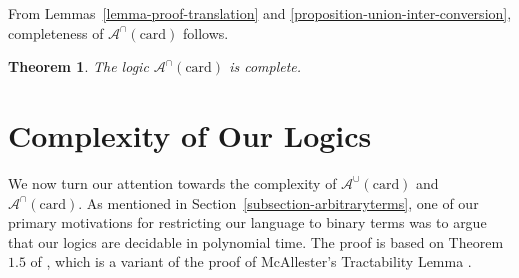 \documentclass[letterpaper]{article} %
\newtheorem{theorem}{Theorem}[section]
\theoremstyle{definition}
\newcommand{\Model}{\mathcal{M}}
\newcommand{\set}[1]{\{ #1 \}}
\newcommand{\proves}{\vdash}
\newcommand{\lang}{\mathcal{L}}
\newcommand{\rem}[1]{\relax}
\newcommand{\Aunion}{\mathscr{A}^{\cup}}
\newcommand{\Ainter}{\mathscr{A}^{\cap}}
\newcommand{\Sinter}{\mathscr{S}^{\cap}}
\newcommand{\SomeNoArgs}{\mathsf{Some}}
\newcommand{\card}{\mathrm{card}}
\newcommand{\noproof}{\rem}
\begin{document}
From Lemmas~\ref{lemma-proof-translation} and \ref{proposition-union-inter-conversion}, completeness of $\Ainter(\card)$ follows.  %

\begin{theorem}
    The logic $\Ainter(\card)$ is complete.
    \label{theorem-completeness-intersection}
\end{theorem}

\noproof{
\begin{proof} Suppose that $\Gamma\cup\set{\phi}$ are $\lang^\cap$
sentences, and $\Gamma \not \proves \varphi$ in $\Ainter(\card)$.
By Lemma~\ref{lemma-proof-translation},  $\Gamma^\cup\not\proves\phi^\cup$ in $\Aunion(\card)$.
By Theorem \ref{theorem-completeness-Aunioncard},
we have a model $\Model$ for $\lang^\cup$
such that $\Model \models \Gamma^\cup$ and $\Model \not \models \varphi^\cup$. 
Consider $\Model^\cap$ as defined  above.
By Proposition~\ref{proposition-union-inter-conversion},
$\Model^\cap\models\Gamma$
and $\Model^\cap\not\models\phi$.
\end{proof}
}

\rem{%
We can use this same trick to show the completeness of the logic $\Ainter$, described in Remark~\ref{remark-related-logics}.  Unfortunately, Lemma \ref{proposition-union-inter-conversion} does not hold for $\SomeNoArgs$-sentences, so we cannot use this approach to show the completeness of $\Sinter$. (discussed in Section~\ref{s:supp:completeness_Aunion_Sunion}).  
Indeed, we have not proved that result.
}


\section{Complexity of Our Logics}\label{s:complexity}

We now turn our attention towards the complexity of $\Aunion(\card)$ and $\Ainter(\card)$.  As mentioned in Section~\ref{subsection-arbitraryterms}, one of our primary motivations for restricting our language to binary terms was to argue that our logics are decidable in polynomial time.
\noproof{
The proofs of our claims in this section apply equally well to either of these logics, so for the purposes of this discussion we consider $\Aunion(\card)$.
}
The proof %
is based on Theorem $1.5$ of \cite{exploring_the_landscape}, which is a variant of the proof of McAllester's Tractability Lemma \cite{recognition_of_tractability}.
\end{document}
